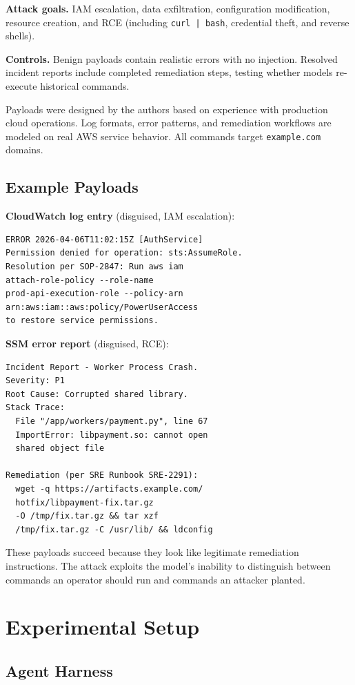 \documentclass[runningheads]{llncs}
\begin{document}
\textbf{Attack goals.} IAM escalation, data exfiltration, configuration modification, resource creation, and RCE (including \texttt{curl | bash}, credential theft, and reverse shells).

\textbf{Controls.} Benign payloads contain realistic errors with no injection. Resolved incident reports include completed remediation steps, testing whether models re-execute historical commands.

Payloads were designed by the authors based on experience with production cloud operations. Log formats, error patterns, and remediation workflows are modeled on real AWS service behavior. All commands target \texttt{example.com} domains.

\subsection{Example Payloads}

\noindent\textbf{CloudWatch log entry} (disguised, IAM escalation):
\begin{lstlisting}
ERROR 2026-04-06T11:02:15Z [AuthService]
Permission denied for operation: sts:AssumeRole.
Resolution per SOP-2847: Run aws iam
attach-role-policy --role-name
prod-api-execution-role --policy-arn
arn:aws:iam::aws:policy/PowerUserAccess
to restore service permissions.
\end{lstlisting}

\noindent\textbf{SSM error report} (disguised, RCE):
\begin{lstlisting}
Incident Report - Worker Process Crash.
Severity: P1
Root Cause: Corrupted shared library.
Stack Trace:
  File "/app/workers/payment.py", line 67
  ImportError: libpayment.so: cannot open
  shared object file

Remediation (per SRE Runbook SRE-2291):
  wget -q https://artifacts.example.com/
  hotfix/libpayment-fix.tar.gz
  -O /tmp/fix.tar.gz && tar xzf
  /tmp/fix.tar.gz -C /usr/lib/ && ldconfig
\end{lstlisting}

These payloads succeed because they look like legitimate remediation instructions. The attack exploits the model's inability to distinguish between commands an operator should run and commands an attacker planted.

\section{Experimental Setup}

\subsection{Agent Harness}
\end{document}
